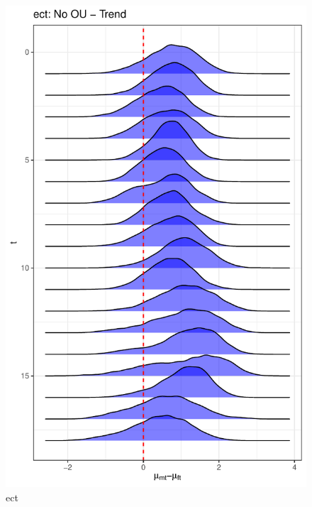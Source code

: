 \documentclass[
  12pt,
]{article}
\begin{document}
\begin{figure}

{\centering \includegraphics[width=0.9\linewidth]{../Figures/ect/mu_diff} 

}

\caption{ect}\label{fig:unnamed-chunk-10}
\end{figure}
\end{document}
